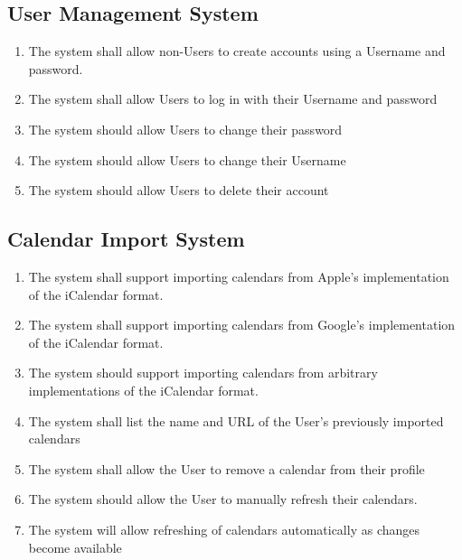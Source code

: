 \documentclass{scrreprt}
\begin{document}
\subsection{User Management System}
    \begin{enumerate}
    \item The system shall allow non-Users to create accounts using a Username and password.
    \item The system shall allow Users to log in with their Username and password
    \item The system should allow Users to change their password
    \item The system should allow Users to change their Username
    \item The system should allow Users to delete their account
    \end{enumerate}

\subsection{Calendar Import System}
    \begin{enumerate}
    \item The system shall support importing calendars from Apple’s implementation of the iCalendar format.
    \item The system shall support importing calendars from Google’s implementation of the iCalendar format.
    \item The system should support importing calendars from arbitrary implementations of the iCalendar format.
    \item The system shall list the name and URL of the User’s previously imported calendars
    \item The system shall allow the User to remove a calendar from their profile
    \item The system should allow the User to manually refresh their calendars.
    \item The system will allow refreshing of calendars automatically as changes become available
    \end{enumerate}
\end{document}
